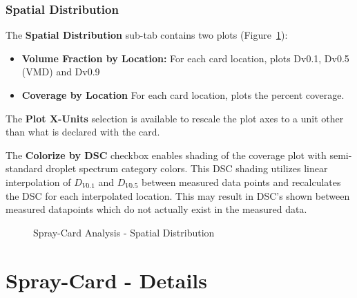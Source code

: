 \documentclass[10pt,letterpaper,titlepage]{article}
\begin{document}
    \FloatBarrier

    \subsubsection{Spatial Distribution}
    The \textbf{Spatial Distribution} sub-tab contains two plots (Figure~\ref{fig:card_spatial_dist}):
    \begin{itemize}
        \item \textbf{Volume Fraction by Location:} For each card location, plots Dv0.1, Dv0.5 (VMD) and Dv0.9
        \item \textbf{Coverage by Location} For each card location, plots the percent coverage.
    \end{itemize}
    The \textbf{Plot X-Units} selection is available to rescale the plot axes to a unit other than what is declared with the card.\par
    The \textbf{Colorize by DSC} checkbox enables shading of the coverage plot with semi-standard droplet spectrum category colors. \color{red}This DSC shading utilizes linear interpolation of $D_{V0.1}$ and $D_{V0.5}$ between measured data points and recalculates the DSC for each interpolated location. This may result in DSC's shown between measured datapoints which do not actually exist in the measured data.\color{black}
    \begin{figure}[hb]
        \centering
        \caption{Spray-Card Analysis - Spatial Distribution}
        \label{fig:card_spatial_dist}
    \end{figure}
    \newpage

    \section{Spray-Card - Details}
\end{document}
